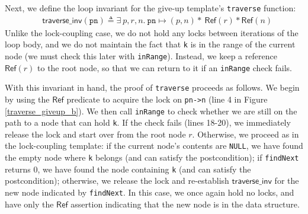 \documentclass[sigplan,10pt, screen]{acmart}
\newcommand{\infp}{\ensuremath{\mathsf{Ref }}}
\begin{document}

Next, we define the loop invariant for the give-up template's \texttt{traverse} function:
\begin{align*} &\mathsf{traverse\_inv}(\texttt{pn}) \triangleq \exists \ p, r, n.\ \texttt{pn} \mapsto (p, n) \ast \ \infp (r) \ast \infp (n)
\end{align*}
Unlike the lock-coupling case, we do not hold any locks between iterations of the loop body, and we do not maintain the fact that \lstinline{k} is in the range of the current node (we must check this later with \lstinline{inRange}). Instead, we keep a reference $\infp(r)$ to the root node, so that we can return to it if an \lstinline{inRange} check fails.

With this invariant in hand, the proof of \texttt{traverse} proceeds as follows. We begin by using the $\infp$ predicate to acquire the lock on \lstinline{pn->n} (line 4 in Figure \ref{traverse_giveup_b}). We then call \lstinline{inRange} to check whether we are still on the path to a node that can hold \lstinline{k}. If the check fails (lines 18-20), we immediately release the lock and start over from the root node $r$. Otherwise, we proceed as in the lock-coupling template: if the current node's contents are \texttt{NULL}, we have found the empty node where \texttt{k} belongs (and can satisfy the postcondition); if \texttt{findNext} returns 0, we have found the node containing \texttt{k} (and can satisfy the postcondition); otherwise, we release the lock and re-establish $\mathsf{traverse\_inv}$ for the new node indicated by \texttt{findNext}. In this case, we once again hold no locks, and have only the $\infp$ assertion indicating that the new node is in the data structure. %

\end{document}
